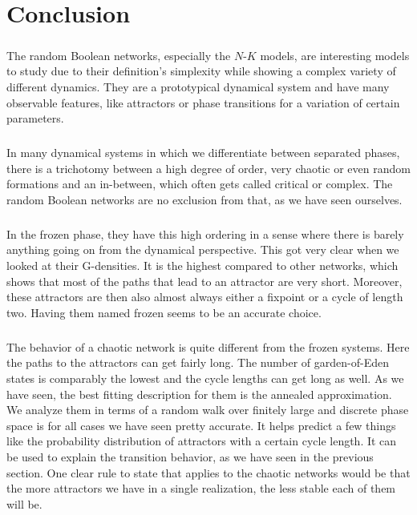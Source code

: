 \chapter{Conclusion}\thispagestyle{fancy}

\paragraph*{}
The random Boolean networks, especially the $N$-$K$ models, are interesting models to study due to their definition's simplexity while showing a complex variety of different dynamics. They are a prototypical dynamical system and have many observable features, like attractors or phase transitions for a variation of certain parameters.

\paragraph*{}
In many dynamical systems in which we differentiate between separated phases, there is a trichotomy between a high degree of order, very chaotic or even random formations and an in-between, which often gets called critical or complex. The random Boolean networks are no exclusion from that, as we have seen ourselves. 

\paragraph*{}
In the frozen phase, they have this high ordering in a sense where there is barely anything going on from the dynamical perspective. This got very clear when we looked at their G-densities. It is the highest compared to other networks, which shows that most of the paths that lead to an attractor are very short. Moreover, these attractors are then also almost always either a fixpoint or a cycle of length two. Having them named frozen seems to be an accurate choice.

\paragraph*{}

The behavior of a chaotic network is quite different from the frozen systems. Here the paths to the attractors can get fairly long. The number of garden-of-Eden states is comparably the lowest and the cycle lengths can get long as well. As we have seen, the best fitting description for them is the annealed approximation. We analyze them in terms of a random walk over finitely large and discrete phase space is for all cases we have seen pretty accurate. It helps predict a few things like the probability distribution of attractors with a certain cycle length. It can be used to explain the transition behavior, as we have seen in the previous section. One clear rule to state that applies to the chaotic networks would be that the more attractors we have in a single realization, the less stable each of them will be.

